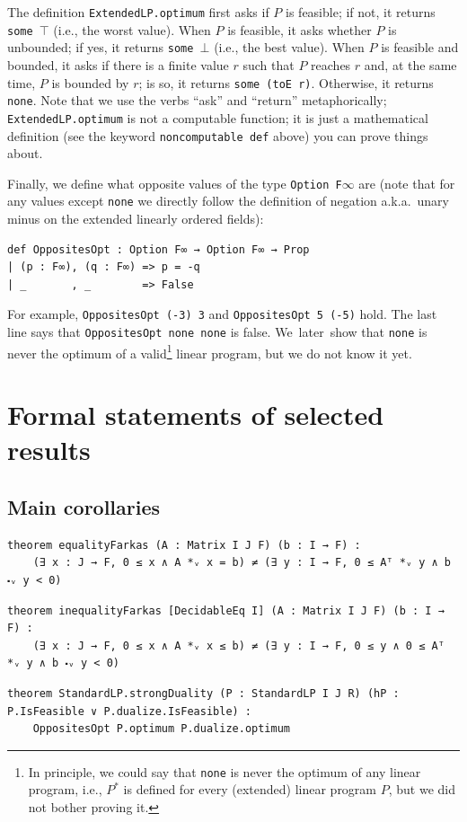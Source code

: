 \documentclass[]{article}
\renewcommand{\.}{\hskip .75pt}
\begin{document}
The definition \texttt{ExtendedLP.optimum} first asks if $P$ is feasible;
if not, it returns \texttt{some $\top$} (i.e., the worst value).
When $P$ is feasible, it asks whether $P$ is unbounded; if yes, it returns \texttt{some $\bot$}
(i.e., the best value).
When $P$ is feasible and bounded,
it asks if there is a finite value $r$ such that $P$ reaches $r$ and, at the same time,
$P$ is bounded by $r$; is so, it returns \texttt{some (toE r)}.
Otherwise, it returns \texttt{none}.
Note that we use the verbs ``ask'' and ``return'' metaphorically;
\texttt{ExtendedLP.optimum} is not a computable function; it is just a mathematical
definition (see the keyword \texttt{noncomputable def} above) you can prove things about.
\pagebreak[2]

Finally, we define what opposite values of the type \texttt{Option F$\infty$} are
(note that for any values except \texttt{none} we directly follow the definition
of negation a.k.a.\ unary minus on the extended linearly ordered fields):
\begin{lstlisting}
def OppositesOpt : Option F∞ → Option F∞ → Prop
| (p : F∞), (q : F∞) => p = -q
| _       , _        => False
\end{lstlisting}
For example, \texttt{OppositesOpt (-3) 3} and \texttt{OppositesOpt 5 (-5)} hold.
The last line says that \texttt{OppositesOpt none none} is false.
We~later~show that \texttt{none} is never the optimum of a valid\footnote{
In principle, we could say that \texttt{none} is never the optimum of any
linear program, i.e., $P^\ast$ is defined for every (extended) linear program $P$,
but we did not bother proving it.} linear program, but we do not know it yet.


\section{Formal statements of selected results}
\label{statements}

\subsection{Main corollaries}

\begin{lstlisting}
theorem equalityFarkas (A : Matrix I J F) (b : I → F) :
    (∃ x : J → F, 0 ≤ x ∧ A *ᵥ x = b) ≠ (∃ y : I → F, 0 ≤ Aᵀ *ᵥ y ∧ b ⬝ᵥ y < 0)
\end{lstlisting}
\begin{lstlisting}
theorem inequalityFarkas [DecidableEq I] (A : Matrix I J F) (b : I → F) :
    (∃ x : J → F, 0 ≤ x ∧ A *ᵥ x ≤ b) ≠ (∃ y : I → F, 0 ≤ y ∧ 0 ≤ Aᵀ *ᵥ y ∧ b ⬝ᵥ y < 0)
\end{lstlisting}
\begin{lstlisting}
theorem StandardLP.strongDuality (P : StandardLP I J R) (hP : P.IsFeasible ∨ P.dualize.IsFeasible) :
    OppositesOpt P.optimum P.dualize.optimum
\end{lstlisting}
\end{document}
